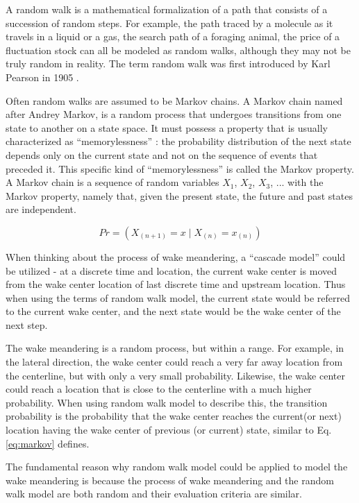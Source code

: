 \documentclass{umthesis}
\begin{document}
A random walk is a mathematical formalization of a path that consists of a succession of random steps. For example, the path traced by a molecule as it travels in a liquid or a gas, the search path of a foraging animal, the price of a fluctuation stock can all be modeled as random walks, although they may not be truly random in reality. The term random walk was first introduced by Karl Pearson in 1905 \cite{Pearson}.

Often random walks are assumed to be Markov chains. A Markov chain named after Andrey Markov, is a random process that undergoes transitions from one state to another on a state space. It must possess a property that is usually characterized as ``memorylessness'' \cite{JamesR}: the probability distribution of the next state depends only on the current state and not on the sequence of events that preceded it. This specific kind of ``memorylessness'' is called the Markov property. A Markov chain is a sequence of random variables $X_1$, $X_2$, $X_3$, ... with the Markov property, namely that, given the present state, the future and past states are independent. 

\begin{equation}\label{eq:markov}
 Pr=(X_{(n+1)} = x \mid X_{(n)}=x_{(n)})
\end{equation}

When thinking about the process of wake meandering, a ``cascade model'' could be utilized - at a discrete time and location, the current wake center is moved from the wake center location of last discrete time and upstream location. Thus when using the terms of random walk model, the current state would be referred to the current wake center, and the next state would be the wake center of the next step.

The wake meandering is a random process, but within a range. For example, in the lateral direction, the wake center could reach a very far away location from the centerline, but with only a very small probability. Likewise, the wake center could reach a location that is close to the centerline with a much higher probability. When using random walk model to describe this, the transition probability is the probability that the wake center reaches the current(or next) location having the wake center of previous (or current) state, similar to Eq. \ref{eq:markov} defines. 
  
The fundamental reason why random walk model could be applied to model the wake meandering is because the process of wake meandering and the random walk model are both random and their evaluation criteria are similar. 
\end{document}

